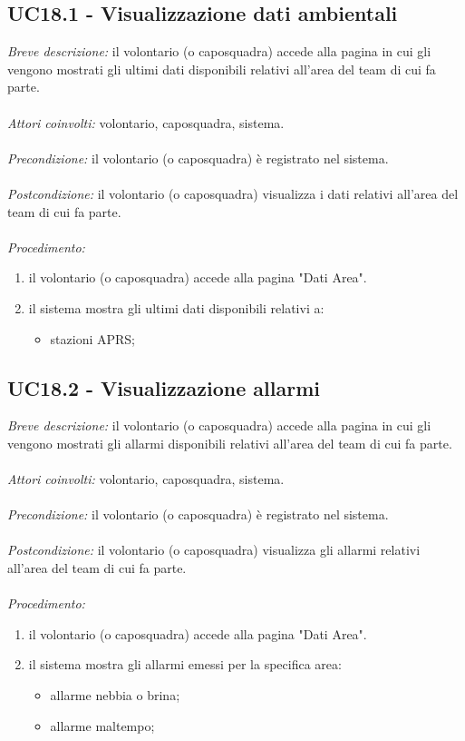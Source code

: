\subsection{UC18.1 - Visualizzazione dati ambientali}
\textit{Breve descrizione:} il volontario (o caposquadra) accede alla pagina in cui gli vengono mostrati gli ultimi dati disponibili relativi all'area del team di cui fa parte. 
\\
\\
\textit{Attori coinvolti:} volontario, caposquadra, sistema.
\\
\\
\textit{Precondizione:} il volontario (o caposquadra) è registrato nel sistema.
\\
\\
\textit{Postcondizione:} il volontario (o caposquadra) visualizza i dati relativi all'area del team di cui fa parte.
\\
\\
\textit{Procedimento:}
\begin{enumerate}
	\item il volontario (o caposquadra) accede alla pagina "Dati Area".
	\item il sistema mostra gli ultimi dati disponibili relativi a:
	\begin{itemize}
		\item stazioni APRS;
	\end{itemize}
\end{enumerate}

\subsection{UC18.2 - Visualizzazione allarmi}
\textit{Breve descrizione:} il volontario (o caposquadra) accede alla pagina in cui gli vengono mostrati gli allarmi disponibili relativi all'area del team di cui fa parte. 
\\
\\
\textit{Attori coinvolti:} volontario, caposquadra, sistema.
\\
\\
\textit{Precondizione:} il volontario (o caposquadra) è registrato nel sistema.
\\
\\
\textit{Postcondizione:} il volontario (o caposquadra) visualizza gli allarmi relativi all'area del team di cui fa parte.
\\
\\
\textit{Procedimento:}
\begin{enumerate}
	\item il volontario (o caposquadra) accede alla pagina "Dati Area".
	\item il sistema mostra gli allarmi emessi per la specifica area:
	\begin{itemize}
		\item allarme nebbia o brina;
		\item allarme maltempo;
	\end{itemize}
\end{enumerate}
